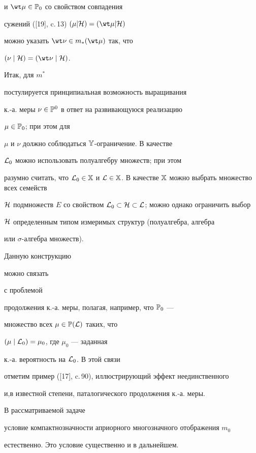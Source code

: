 и ${\wt \mu} \in {{\Bbb P}_0}$ со свойством совпадения


сужений ([19], c.\,13) $(\mu | {\cal H}) = ({\wt \mu} | {\cal H})$


можно указать ${\wt \nu} \in {m_*}(\wt \mu)$ так, что


$(\nu \mid {\cal H}) = ({\wt \nu} \mid {\cal H})$.


Итак, для $m^*$


постулируется принципиальная возможность выращивания


к.-а. меры $\nu \in {{\Bbb P}^0}$ в ответ на развивающуюся реализацию


$\mu \in {{\Bbb P}_0}$; при этом для


$\mu$ и $\nu$ должно соблюдаться ${\Bbb Y}$-ограничение. В качестве


${\cal L}_0$ можно использовать полуалгебру множеств; при этом


разумно считать, что ${{\cal L}_0} \in {\Bbb X}$ и ${\cal L} \in


{\Bbb X}$. В качестве ${\Bbb X}$ можно выбрать множество всех семейств


${\cal H}$ подмножеств $E$ со свойством ${{\cal L}_0} \subset


{\cal H} \subset {\cal L}$; можно однако ограничить выбор


${\cal H}$ определенным типом измеримых структур (полуалгебра, алгебра


или $\sigma$-алгебра множеств).


Данную конструкцию


можно связать


с проблемой


продолжения к.-а. меры, полагая, например, что ${\Bbb P}_0$ ---


множество всех $\mu \in {{\Bbb P}({\cal L})}$ таких, что


$(\mu \mid {{\cal L}_0}) = {{\mu}_0}$, где ${\mu}_0$ --- заданная


к.-а. вероятность на ${\cal L}_0$. В этой связи


отметим пример ([17], c.\,90), иллюстрирующий эффект неединственного


и,в известной степени, паталогического продолжения к.-а. меры.


В рассматриваемой задаче


условие компактнозначности априорного многозначного отображения $m_0$


естественно. Это условие существенно и в дальнейшем.





